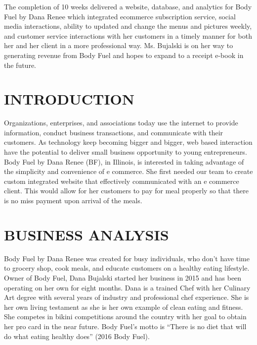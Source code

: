 \documentclass[letterpaper,11pt,2p]{elsarticle}
\begin{document}
The completion of 10 weeks delivered a website, database, and analytics for Body Fuel by Dana Renee which integrated ecommerce subscription service, social media interactions, ability to updated and change the menus and pictures weekly, and customer service interactions with her customers in a timely manner for both her and her client in a more professional way.  Ms. Bujalski is on her way to generating revenue from Body Fuel and hopes to expand to a receipt e-book in the future.\\

\section{ INTRODUCTION}%
\label{intro}%

Organizations, enterprises, and associations today use the internet to provide information, conduct business transactions, and communicate with their customers. As technology keep becoming bigger and bigger, web based interaction have the potential to deliver small business opportunity to young entrepreneurs. Body Fuel by Dana Renee (BF), in Illinois, is interested in taking advantage of the simplicity and convenience of e commerce. She first needed our team to create custom integrated website that effectively communicated with an e commerce client. This would allow for her customers to pay for meal properly so that there is no miss payment upon arrival of the meals.   


\newpage 

\section{ BUSINESS ANALYSIS}%
\label{BA}%

Body Fuel by Dana Renee was created for busy individuals, who don’t have time to grocery shop, cook meals, and educate customers on a healthy eating lifestyle. Owner of Body Fuel, Dana Bujalski started her business in 2015 and has been operating on her own for eight months. Dana is a trained Chef with her Culinary Art degree with several years of industry and professional chef experience. She is her own living testament as she is her own example of clean eating and fitness. She competes in bikini competitions around the country with her goal to obtain her pro card in the near future.  Body Fuel’s motto is “There is no diet that will do what eating healthy does” (2016 Body Fuel).\\ 
\end{document}
